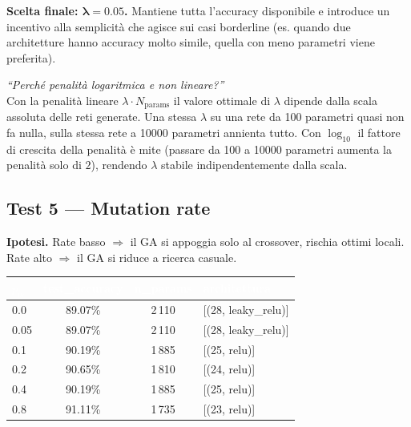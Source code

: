 \documentclass[11pt,a4paper]{article}
\begin{document}
\textbf{Scelta finale: $\bm{\lambda = 0.05}$.} Mantiene tutta l'accuracy
disponibile e introduce un incentivo alla semplicità che agisce sui casi
borderline (es. quando due architetture hanno accuracy molto simile,
quella con meno parametri viene preferita).

\begin{domanda}
\textit{``Perché penalità logaritmica e non lineare?''}\\
Con la penalità lineare $\lambda \cdot N_{\text{params}}$ il valore
ottimale di $\lambda$ dipende dalla scala assoluta delle reti generate.
Una stessa $\lambda$ su una rete da 100 parametri quasi non fa nulla,
sulla stessa rete a 10000 parametri annienta tutto. Con $\log_{10}$ il
fattore di crescita della penalità è mite (passare da 100 a 10000
parametri aumenta la penalità solo di $2$), rendendo $\lambda$ stabile
indipendentemente dalla scala.
\end{domanda}

\subsection{Test 5 — Mutation rate}

\textbf{Ipotesi.} Rate basso $\Rightarrow$ il GA si appoggia solo al
crossover, rischia ottimi locali. Rate alto $\Rightarrow$ il GA si riduce
a ricerca casuale.

\begin{center}
\begin{tabular}{lccl}
    \toprule
    \rowcolor{headerblue}
    \textcolor{white}{\textbf{$p_m$}} &
    \textcolor{white}{\textbf{test\_accuracy}} &
    \textcolor{white}{\textbf{n\_params}} &
    \textcolor{white}{\textbf{architettura}} \\
    \midrule
    0.0  & 89.07\%  & 2\,110 & [(28, leaky\_relu)] \\
    \rowcolor{rowgray}
    0.05 & 89.07\%  & 2\,110 & [(28, leaky\_relu)] \\
    0.1  & 90.19\%  & 1\,885 & [(25, relu)]        \\
    \rowcolor{rowgray}
    0.2  & 90.65\%  & 1\,810 & [(24, relu)]        \\
    0.4  & 90.19\%  & 1\,885 & [(25, relu)]        \\
    \rowcolor{rowgray}
    0.8  & 91.11\%  & 1\,735 & [(23, relu)]        \\
    \bottomrule
\end{tabular}
\end{center}
\end{document}
